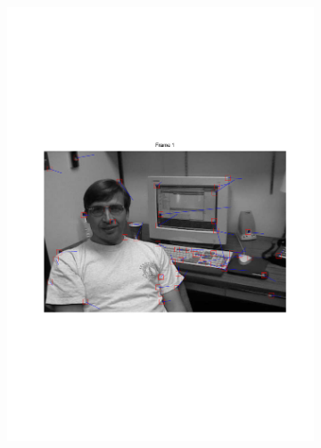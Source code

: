 \documentclass[11pt,a4paper]{article}
\begin{document}
\begin{figure}[H]
\centering
\begin{subfigure}{0.45\textwidth}
\includegraphics[scale=0.4,trim={120 250 0 250}]{img/tracker_dudekface_1.pdf}
\end{subfigure}
\begin{subfigure}{0.45\textwidth}

\end{subfigure}
\end{figure}
\end{document}
